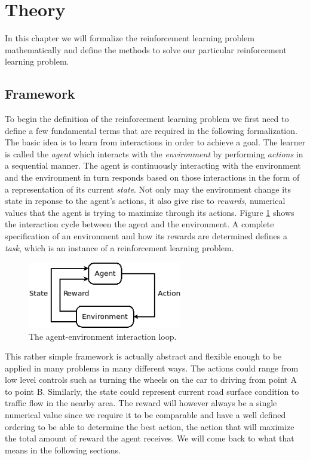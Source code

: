 \documentclass[result.tex]{subfiles}
\begin{document}
    \section*{\centering Theory}

    In this chapter we will formalize the reinforcement learning problem mathematically and define the methods to solve our particular reinforcement learning problem.

    \subsection*{Framework}

    To begin the definition of the reinforcement learning problem we first need to define a few fundamental terms that are required in the following formalization. The basic idea is to learn from interactions in order to achieve a goal. The learner is called the \textit{agent} which interacts with the \textit{environment} by performing \textit{actions} in a sequential manner. The agent is continuously interacting with the environment and the environment in turn responds based on those interactions in the form of a representation of its current \textit{state}. Not only may the environment change its state in reponse to the agent's actions, it also give rise to \textit{rewards}, numerical values that the agent is trying to maximize through its actions. Figure \ref{fig:agent_env} shows the interaction cycle between the agent and the environment. A complete specification of an environment and how its rewards are determined defines a \textit{task}, which is an instance of a reinforcement learning problem.

    \begin{figure}[H]
        \centering
        \includegraphics[width=0.6\textwidth]{./images/agent_env}
        \caption{The agent-environment interaction loop.}
        \label{fig:agent_env}
    \end{figure}

    This rather simple framework is actually abstract and flexible enough to be applied in many problems in many different ways. The actions could range from low level controls such as turning the wheels on the car to driving from point A to point B. Similarly, the state could represent current road surface condition to traffic flow in the nearby area. The reward will however always be a single numerical value since we require it to be comparable and have a well defined ordering to be able to determine the best action, the action that will maximize the total amount of reward the agent receives. We will come back to what that means in the following sections.
\end{document}
